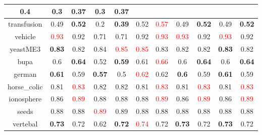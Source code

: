 \documentclass{article}%
\begin{document}
\begin{tabular}{c|cccccccccc}
{0.4
}&0.3&\textbf{0.37}&0.3&\textbf{0.37}\\%
\hline%
transfusion&0.49&\textbf{0.52}&0.2&\textbf{0.39}&0.52&\textcolor{red}{ 
0.57
}&0.49&\textbf{0.52}&0.49&\textbf{0.52}\\%
\hline%
vehicle&\textcolor{red}{ 
0.93
}&0.92&0.71&0.71&0.92&\textcolor{red}{ 
0.93
}&\textcolor{red}{ 
0.93
}&0.92&\textcolor{red}{ 
0.93
}&0.92\\%
\hline%
yeastME3&\textbf{0.83}&0.82&0.84&\textcolor{red}{ 
0.85
}&\textcolor{red}{ 
0.85
}&0.83&0.82&0.82&\textbf{0.83}&0.82\\%
\hline%
bupa&0.6&\textbf{0.64}&0.52&\textbf{0.59}&0.61&\textcolor{red}{ 
0.66
}&0.6&\textbf{0.64}&0.6&\textbf{0.64}\\%
\hline%
german&\textbf{0.61}&0.59&\textbf{0.57}&0.5&\textcolor{red}{ 
0.62
}&0.62&\textbf{0.6}&0.59&\textbf{0.61}&0.59\\%
\hline%
horse\_colic&0.81&\textcolor{red}{ 
0.83
}&0.82&0.82&0.81&\textcolor{red}{ 
0.83
}&0.81&\textcolor{red}{ 
0.83
}&0.81&\textcolor{red}{ 
0.83
}\\%
\hline%
ionosphere&0.86&\textcolor{red}{ 
0.89
}&0.88&0.88&0.88&\textcolor{red}{ 
0.89
}&0.86&\textcolor{red}{ 
0.89
}&0.86&\textcolor{red}{ 
0.89
}\\%
\hline%
seeds&0.88&0.88&\textcolor{red}{ 
0.89
}&0.89&0.88&0.88&0.88&0.88&0.88&0.88\\%
\hline%
vertebal&\textbf{0.73}&0.72&0.62&\textbf{0.72}&\textcolor{red}{ 
0.74
}&0.72&\textbf{0.73}&0.72&\textbf{0.73}&0.72\\%
\hline%
\end{tabular}

%
\end{document}

